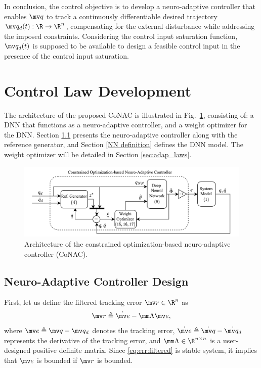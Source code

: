\documentclass[lettersize,journal]{IEEEtran}
\newcommand*{\fe}{\mv r}
\newcommand*{\q}{\mv q}
\newcommand*{\dq}{\dot{\mv q}}
\newcommand*{\qd}{\mv q_d}
\newcommand*{\dqd}{\dot{\mv q_d}}
\begin{document}
In conclusion, the control objective is to develop a neuro-adaptive controller that enables $\q$ to track a continuously differentiable desired trajectory $\qd(t): \R \to \R^n$, compensating for the external disturbance while addressing the imposed constraints.
Considering the control input saturation function, $\qd(t)$ is supposed to be available to design a feasible control input in the presence of the control input saturation.

\section{Control Law Development}\label{sec:ctrl design}

The architecture of the proposed CoNAC is illustrated in Fig.~\ref{fig: controller}, consisting of: a DNN that functions as a neuro-adaptive controller, and a weight optimizer for the DNN. 
Section \ref{sec:NAC} presents the neuro-adaptive controller along with the reference generator, and Section \ref{NN definition} defines the DNN model. The weight optimizer will be detailed in Section \ref{sec:adap_laws}.

\begin{figure}[!t]
    \centering
    \includegraphics[width=0.7\linewidth]{fig/Controller.drawio.png}
    \caption{Architecture of the constrained optimization-based neuro-adaptive controller (CoNAC).}
    \label{fig: controller}
\end{figure}

\subsection{Neuro-Adaptive Controller Design}\label{sec:NAC}

First, let us define the filtered tracking error $\fe\in\R^n$ as 
\begin{equation}
    \fe \triangleq \dot{\mv e}-\mm\Lambda \mv e
    ,
    \label{eq:err:filtered}
\end{equation}
where $\mv e \triangleq \q - \qd$ denotes the tracking error, $\dot{\mv e} \triangleq \dq - \dqd$ represents the derivative of the tracking error, and $\mm\Lambda\in\R^{n\times n}$ is a user-designed positive definite matrix.
Since \eqref{eq:err:filtered} is stable system, it implies that $\mv e$ is bounded if $\fe$ is bounded.
\end{document}
